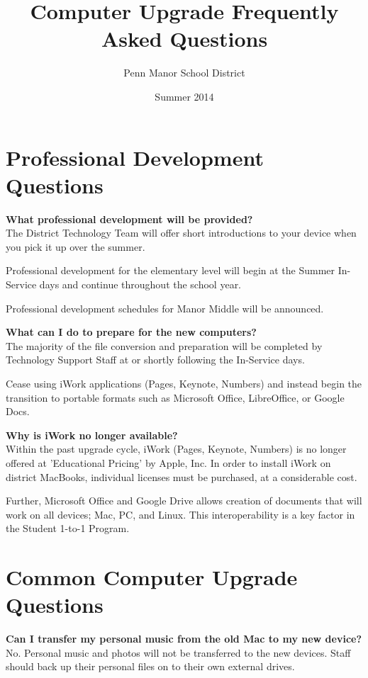 \documentclass[10pt,foldmark,notumble]{leaflet}
\title{Computer Upgrade Frequently Asked Questions}
\author{Penn Manor School District}
\date{Summer 2014}
\begin{document}
\maketitle
\thispagestyle{empty}
\section{Professional Development Questions\color{red}\hrulefill\color{black}}
\textbf{What professional development will be provided?}\\
The District Technology Team will offer short introductions to your device when you pick it up over the summer.

Professional development for the elementary level will begin at the Summer In-Service days and continue throughout the school year.

Professional development schedules for Manor Middle will be announced.

\textbf{What can I do to prepare for the new computers?}\\
The majority of the file conversion and preparation will be completed by Technology Support Staff at or shortly following the In-Service days.

Cease using iWork applications (Pages, Keynote, Numbers) and instead begin the transition to portable formats such as Microsoft Office, LibreOffice, or Google Docs.

\textbf{Why is iWork no longer available?}\\
Within the past upgrade cycle, iWork (Pages, Keynote, Numbers) is no longer offered at 'Educational Pricing' by Apple, Inc.
In order to install iWork on district MacBooks, individual licenses must be purchased, at a considerable cost.


Further, Microsoft Office and Google Drive allows creation of documents that will work on all devices; Mac, PC, and Linux.
This interoperability is a key factor in the Student 1-to-1 Program.

\section{Common Computer Upgrade Questions\color{red}\hrulefill\color{black}}
\textbf{Can I transfer my personal music from the old Mac to my new device?}\\
No. Personal music and photos will not be transferred to the new devices. Staff should back up their personal files on to their own external drives.
\end{document}
